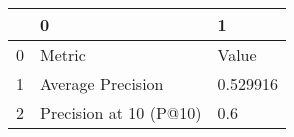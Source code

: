 \begin{tabular}{lll}
\toprule
{} &                       0 &         1 \\
\midrule
0 &                  Metric &     Value \\
1 &       Average Precision &  0.529916 \\
2 &  Precision at 10 (P@10) &       0.6 \\
\bottomrule
\end{tabular}
